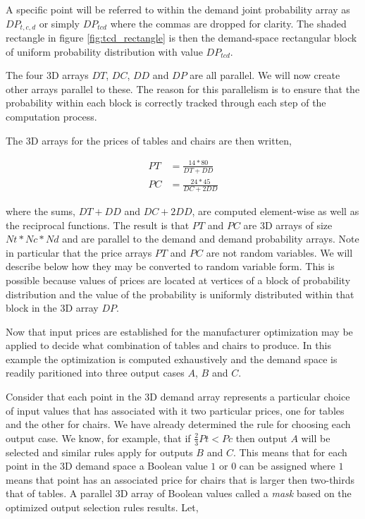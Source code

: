 A specific point will be referred to within the demand joint probability array as $DP_{t,c,d}$ or simply $DP_{tcd}$ where the commas are dropped for clarity. The shaded rectangle in figure \ref{fig:tcd_rectangle} is then the demand-space rectangular block of uniform probability distribution with value $DP_{tcd}$.

The four 3D arrays $DT$, $DC$, $DD$ and $DP$ are all parallel. We will now create other arrays parallel to these. The reason for this parallelism is to ensure that the probability within each block is correctly tracked through each step of the computation process.

The 3D arrays for the prices of tables and chairs are then written,

\begin{align*}
PT &= \frac{14*80}{DT + DD}\\
PC &= \frac{24*45}{DC + 2 DD}
\end{align*}

where the sums, $DT+DD$ and $DC + 2DD$, are computed element-wise as well as the reciprocal functions. The result is that $PT$ and $PC$ are 3D arrays of size $Nt*Nc*Nd$ and are parallel to the demand and demand probability arrays. Note in particular that the price arrays $PT$ and $PC$ are not random variables. We will describe below how they may be converted to random variable form. This is possible because values of prices are located at vertices of a block of probability distribution and the value of the probability is uniformly distributed within that block in the 3D array $DP$.

Now that input prices are established for the manufacturer optimization may be applied to decide what combination of tables and chairs to produce. In this example the optimization is computed exhaustively and the demand space is readily paritioned into three output cases $A$, $B$ and $C$. 

Consider that each point in the 3D demand array represents a particular choice of input values that has associated with it two particular prices, one for tables and the other for chairs. We have already determined the rule for choosing each output case. We know, for example, that if $\frac{2}{3}Pt < Pc$ then output $A$ will be selected and similar rules apply for outputs $B$ and $C$. This means that for each point in the 3D demand space a Boolean value $1$ or $0$ can be assigned where $1$ means that point has an associated price for chairs that is larger then two-thirds that of tables. A parallel 3D array of Boolean values called a \emph{mask} based on the optimized output selection rules results. Let,

